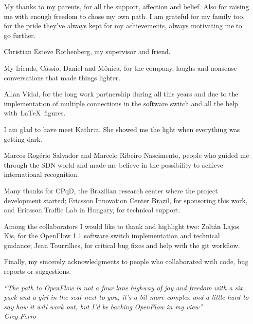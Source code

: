 \begin{agradecimentos}
   
    My thanks to my parents, for all the support, affection and belief. Also for raising me with enough freedom to chose my own path. I am grateful for my family too, for the pride they've always kept for my achievements, always motivating me to go further. 

    Christian Esteve Rothenberg, my supervisor and friend. 

    My friends, C\'{a}ssio, Daniel and M\^{o}nica, for the company, laughs and nonsense conversations that made things lighter. 
    
    Allan Vidal, for the long work partnership during all this years and due to the implementation of multiple connections in the software switch and all the help with~\LaTeX~figures.

    I am glad to have meet Kathrin. She showed me the light when everything was getting dark.

    Marcos Rog\'{e}rio Salvador and Marcelo Ribeiro Nascimento, people who guided me through the SDN world and made me believe in the possibility to achieve international recognition.
    
    Many thanks for CPqD, the Brazilian research center where the project development started; Ericsson Innovation Center Brazil, for sponsoring this work, and Ericsson Traffic Lab in Hungary, for technical support. 

    Among the collaborators I would like to thank and highlight two: Zoltán Lajos Kis, for the OpenFlow 1.1 software switch implementation and technical guidance; Jean Tourrilhes, for critical bug fixes and help with the git workflow.

    Finally, my sincerely acknowledgments to people who collaborated with code, bug reports or suggestions.
    
    
\end{agradecimentos}

\begin{epigrafe}
    \vspace*{\fill}
	\begin{flushright}
		\textit{``The path to OpenFlow is not a four lane highway of joy and freedom with a six pack and a girl in the seat next to you, it’s a bit more complex and a little hard to say how it will work out, but I’d be backing OpenFlow in my view''\\
		Greg Ferro}
	\end{flushright}
\end{epigrafe}



